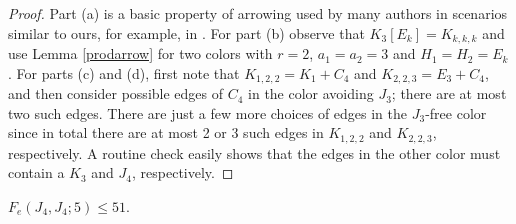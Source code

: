 \begin{proof}
Part (a) is a basic property of arrowing
used by many authors in scenarios similar to ours,
for example, in \cite{Nenov81}.
For part (b) observe that $K_3[E_k]=K_{k,k,k}$
and use Lemma \ref{prodarrow} for two colors with
$r=2$, $a_1=a_2=3$ and $H_1=H_2=E_k$. For parts
(c) and (d), first note that
$K_{1,2,2}=K_1+C_4$ and $K_{2,2,3}=E_3+C_4$,
and then consider possible edges of $C_4$ in the
color avoiding $J_3$; there are at most two such edges.
There are just a few more choices of edges in the
$J_3$-free color since in total there are at most
2 or 3 such edges in $K_{1,2,2}$ and $K_{2,2,3}$,
respectively. A routine check easily shows that
the edges in the other color must contain a $K_3$
and $J_4$, respectively.
\end{proof}

\medskip
\begin{theorem} \label{FvJ4J4K5}
$F_e(J_4,J_4;5) \leq 51$.
\end{theorem}

